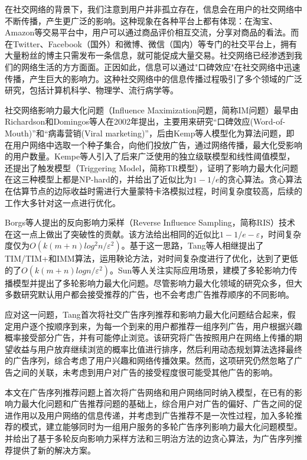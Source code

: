在社交网络的背景下，我们注意到用户并非孤立存在，信息会在用户的社交网络中不断传播，产生更广泛的影响。这种现象在各种平台上都有体现：在淘宝、Amazon等交易平台中，用户可以通过商品评价相互交流，分享对商品的看法。而在Twitter、Facebook（国外）和微博、微信（国内）等专门的社交平台上，拥有大量粉丝的博主只需发布一条信息，就可能促成大量交易。社交网络已经渗透到我们的网络生活的方方面面。正因如此，信息可以通过"口碑效应"在社交网络中迅速传播，产生巨大的影响力。这种社交网络中的信息传播过程吸引了多个领域的广泛研究，包括计算机科学、物理学、流行病学等\cite{li2018influence}。

社交网络影响力最大化问题（Influence Maximization问题，简称IM问题）最早由Richardson和Domingos等人\cite{richardson2002mining}在2002年提出，主要用来研究“口碑效应(Word-of-Mouth)”和“病毒营销(Viral marketing)”，后由Kemp等人\cite{kempe2003maximizing}模型化为算法问题，即在用户网络中选取一个种子集合，向他们投放广告，通过网络传播，最大化受影响的用户数量。Kempe等人引入了后来广泛使用的独立级联模型\cite{goldenberg2001talk}和线性阈值模型\cite{granovetter1978threshold}，还提出了触发模型（Triggering Model，简称TR模型），证明了影响力最大化问题在这三种模型上都是NP-hard的，并给出了近似比为$1-1/e$的贪心算法。贪心算法在估算节点的边际收益时需进行大量蒙特卡洛模拟过程，时间复杂度较高，后续的工作大多针对这一点进行优化。

Borgs等人\cite{borgs2014maximizing}提出的反向影响力采样（Reverse Influence Sampling，简称RIS）技术在这一点上做出了突破性的贡献。该方法给出相同的近似比$1-1/e-\varepsilon$，时间复杂度仅为$O(k(m+n)log^2n/\varepsilon^2)$。基于这一思路，Tang等人相继提出了TIM/TIM+\cite{tang2014influence}和IMM\cite{tang2015influence}算法，运用鞅论方法，对时间复杂度进行了优化，达到了更低的了$O(k(m+n)logn/\varepsilon^2)$。Sun等人关注实际应用场景，建模了多轮影响力传播模型并提出了多轮影响力最大化问题\cite{mrim}。尽管影响力最大化领域的研究众多，但大多数研究默认用户都会接受推荐的广告，也不会考虑广告推荐顺序的不同影响。

应对这一问题，Tang\cite{tang2018social}首次将社交广告序列推荐和影响力最大化问题结合起来，假定用户逐个按顺序到来，为每一个到来的用户都推荐一组序列广告，用户根据兴趣概率接受部分广告，并有可能停止浏览。该研究将广告按照用户在网络上传播的期望收益与用户放弃继续浏览的概率比值进行排序，然后利用动态规划算法选择最终的广告序列，综合考虑了用户兴趣和网络传播效果。然而，这项研究仍然忽略了广告之间的关联，未考虑到用户对广告的接受程度很可能受其他广告的影响。

本文在广告序列推荐问题上首次将广告网络和用户网络同时纳入模型，在已有的影响力最大化问题和广告推荐问题的基础上，综合用户对广告的偏好、广告之间的促进作用以及用户网络的信息传递，并考虑到广告推荐不是一次性过程，加入多轮推荐的模式，建立能够同时为一组用户服务的多轮广告序列影响力最大化问题模型。并给出了基于多轮反向影响力采样方法和三明治方法的边贪心算法，为广告序列推荐提供了新的解决方案。

